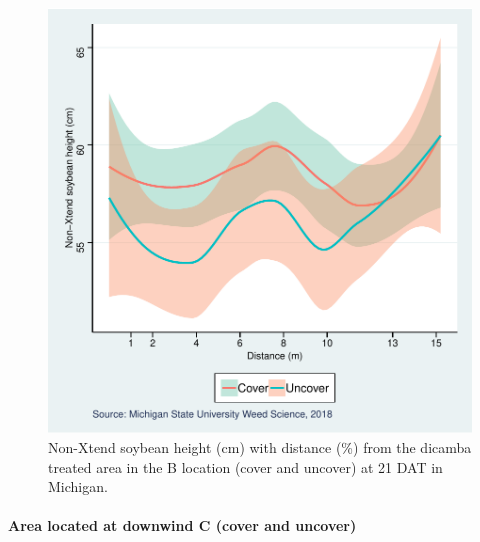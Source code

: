 \documentclass[]{article}
\let\oldparagraph\paragraph
\renewcommand{\paragraph}[1]{\oldparagraph{#1}\mbox{}}
\begin{document}
\begin{figure}
\centering
\includegraphics{Report_Dicamba_study_files/figure-latex/unnamed-chunk-58-1.pdf}
\caption{Non-Xtend soybean height (cm) with distance (\%) from the
dicamba treated area in the B location (cover and uncover) at 21 DAT in
Michigan.}
\end{figure}

\newpgae
\pagebreak

\paragraph{Area located at downwind C (cover and
uncover)}\label{area-located-at-downwind-c-cover-and-uncover-1}
\end{document}
